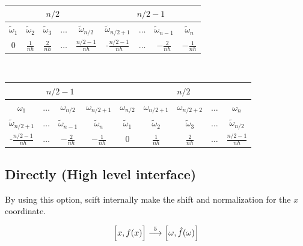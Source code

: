 \begin{center}
\begin{tabular}{|c|c|c|c|c|c|c|c|c|}
\multicolumn{5}{c|}{$n/2$} & \multicolumn{4}{c}{$n/2-1$} \\
\hline
$\tilde{\omega}_1$ & $\tilde{\omega}_2$ & $\tilde{\omega}_3$ & $\ldots$ & $\tilde{\omega}_{n/2}$ & $\tilde{\omega}_{n/2+1}$ & $\ldots$ & $\tilde{\omega}_{n-1}$ 
& $\tilde{\omega}_n$ \\
\hline\hline
$0$ & $\frac{1}{nh}$ & $\frac{2}{nh}$ & $\ldots$ & $\frac{n/2-1}{nh}$ & -$\frac{n/2-1}{nh}$ & $\ldots$ & $-\frac{2}{nh}$ & $-\frac{1}{nh}$ \\
\hline
\end{tabular}
\\[6mm]
\begin{tabular}{|c|c|c|c|c|c|c|c|c|}
\multicolumn{4}{c|}{$n/2-1$} & \multicolumn{5}{c}{$n/2$} \\
\hline
$\omega_1$ & $\ldots$ & $\omega_{n/2}$ & $\omega_{n/2+1}$ & $\omega_{n/2}$ & $\omega_{n/2+1}$ & $\omega_{n/2+2}$ & $\ldots$ & $\omega_n$ \\
\hline\hline
$\tilde{\omega}_{n/2+1}$ & $\ldots$ & $\tilde{\omega}_{n-1}$ & $\tilde{\omega}_{n}$ & $\tilde{\omega}_{1}$ & $\tilde{\omega}_{2}$ & $\tilde{\omega}_3$ & 
$\ldots$ & $\tilde{\omega}_{n/2}$ \\
\hline
-$\frac{n/2-1}{nh}$ & $\ldots$ & $-\frac{2}{nh}$ & $-\frac{1}{nh}$ & $0$ & $\frac{1}{nh}$ & $\frac{2}{nh}$ & $\ldots$ & $\frac{n/2-1}{nh}$ \\
\hline
\end{tabular}
\end{center}
\vspace{5mm}


\subsection{Directly (High level interface)}
By using this option, scift internally make the shift and normalization for the $x$ coordinate.

\begin{equation}
\Bigl[x,f(x)\Bigr]
\stackrel{\text{5}}{\longrightarrow}
\Bigl[\omega,\hat{f}(\omega)\Bigr]
\end{equation}

